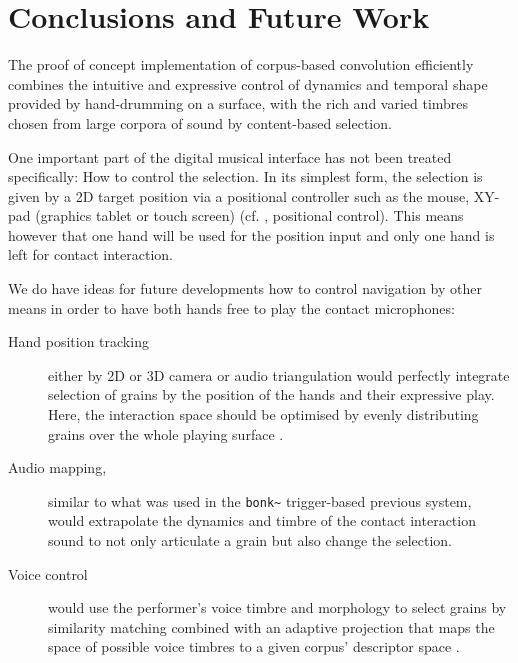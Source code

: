 \section{Conclusions and Future Work}\label{sec:future}

The proof of concept implementation of corpus-based convolution efficiently combines the intuitive and expressive control of dynamics and temporal shape provided by hand-drumming on a surface, with the rich and varied timbres chosen from large corpora of sound by content-based selection.


One important part of the digital musical interface has not been treated specifically: How to control the selection.  In its simplest form, the selection is given by a 2D target position via a positional controller such as the mouse, XY-pad (graphics tablet or touch screen) (cf. \cite{Schwarz-nime2012-sound-space}, positional control).
This means however that one hand will be used for the position input and only one hand is left for contact interaction.

We do have ideas for future developments how to control navigation by other means in order to have both hands free to play the contact microphones:

\begin{description}
\item[Hand position tracking] either by 2D or 3D camera or audio triangulation would perfectly integrate selection of grains by the position of the hands and their expressive play.  Here, the interaction space should be optimised by evenly distributing grains over the whole playing surface \cite{LallemandSchwarz-dafx2011-distribute}.
\item[Audio mapping,] similar to what was used in the \verb|bonk~| trigger-based previous system, would extrapolate the dynamics and timbre of the contact interaction sound to not only articulate a grain but also change the selection.
\item[Voice control] would use the performer's voice timbre and morphology to select grains by similarity matching combined with an adaptive projection that maps the space of possible voice timbres to a given corpus' descriptor space \cite{StowellPlumbley-smc2010-timbre-remapping-regression-tree,Fasciani-si2013b}.
\end{description}

